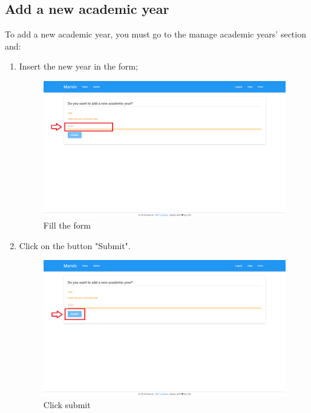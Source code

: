 \documentclass[ManualeUtente]{subfiles}
\begin{document}
\subsection{Add a new academic year}
To add a new academic year, you must go to the manage academic years' section and:
\begin{enumerate}
	\item Insert the new year in the form;
	\begin{figure}[H]
		\centering
		\includegraphics[width=0.7\linewidth]{image/UniversityAddYear1}
		\caption[Add year form]{Fill the form}
		\label{fig:Add a new academic year, fill the form}
	\end{figure}
	\item Click on the button "Submit".
	\begin{figure}[H]
		\centering
		\includegraphics[width=0.7\linewidth]{image/UniversityAddYear2}
		\caption[Add year submit]{Click submit}
		\label{fig:CLick submit}
	\end{figure}
\end{enumerate}
\end{document}
